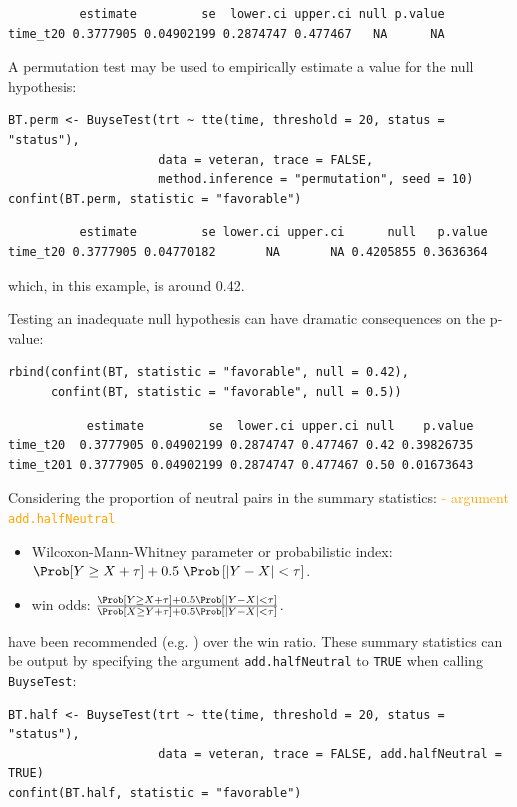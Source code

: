\documentclass[12pt]{article}
\newcommand\Warning[1][3ex]{%
\renewcommand\stacktype{L}%
\scaleto{\stackon[1.3pt]{\color{red}$\triangle$}{\tiny\bfseries !}}{#1}%
\xspace
}
\begin{document}
\begin{verbatim}
          estimate         se  lower.ci upper.ci null p.value
time_t20 0.3777905 0.04902199 0.2874747 0.477467   NA      NA
\end{verbatim}


A permutation test may be used to empirically estimate a value for the
null hypothesis:
\lstset{language=r,label= ,caption= ,captionpos=b,numbers=none}
\begin{lstlisting}
BT.perm <- BuyseTest(trt ~ tte(time, threshold = 20, status = "status"),
                     data = veteran, trace = FALSE,
                     method.inference = "permutation", seed = 10)
confint(BT.perm, statistic = "favorable")
\end{lstlisting}

\begin{verbatim}
          estimate         se lower.ci upper.ci      null   p.value
time_t20 0.3777905 0.04770182       NA       NA 0.4205855 0.3636364
\end{verbatim}


which, in this example, is around 0.42.

\bigskip

\Warning Testing an inadequate null hypothesis can have dramatic
consequences on the p-value:
\lstset{language=r,label= ,caption= ,captionpos=b,numbers=none}
\begin{lstlisting}
rbind(confint(BT, statistic = "favorable", null = 0.42),
      confint(BT, statistic = "favorable", null = 0.5))
\end{lstlisting}

\begin{verbatim}
           estimate         se  lower.ci upper.ci null    p.value
time_t20  0.3777905 0.04902199 0.2874747 0.477467 0.42 0.39826735
time_t201 0.3777905 0.04902199 0.2874747 0.477467 0.50 0.01673643
\end{verbatim}


\clearpage

\noindent Considering the proportion of neutral pairs in the summary
statistics: \hfill \textcolor{orange}{- argument \texttt{add.halfNeutral}}
\begin{itemize}
\item Wilcoxon-Mann-Whitney parameter or probabilistic index: \(\Prob[Y\geq X + \tau] + 0.5 \; \Prob\left[|Y- X| < \tau\right]\).
\item win odds: \(\frac{\Prob[Y\geq X + \tau] + 0.5 \Prob\left[|Y- X| < \tau\right]}{\Prob[X\geq Y + \tau] + 0.5 \Prob\left[|Y- X| < \tau\right]}\).
\end{itemize}
have been recommended (e.g. \cite{ajufo2023fallacies}) over the win
ratio. These summary statistics can be output by specifying the
argument \texttt{add.halfNeutral} to \texttt{TRUE} when calling \texttt{BuyseTest}:
\lstset{language=r,label= ,caption= ,captionpos=b,numbers=none}
\begin{lstlisting}
BT.half <- BuyseTest(trt ~ tte(time, threshold = 20, status = "status"),
                     data = veteran, trace = FALSE, add.halfNeutral = TRUE)
confint(BT.half, statistic = "favorable")
\end{lstlisting}
\end{document}
